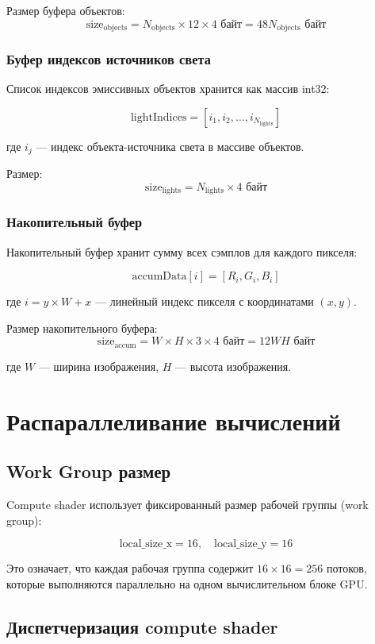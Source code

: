 \documentclass[14pt, a4paper]{extarticle}
\begin{document}
Размер буфера объектов:
\[
\text{size}_{\text{objects}} = N_{\text{objects}} \times 12 \times 4 \text{ байт} = 48N_{\text{objects}} \text{ байт}
\]

\subsubsection{Буфер индексов источников света}

Список индексов эмиссивных объектов хранится как массив int32:

\[
\text{lightIndices} = [i_1, i_2, \ldots, i_{N_{\text{lights}}}]
\]

где $i_j$ --- индекс объекта-источника света в массиве объектов.

Размер:
\[
\text{size}_{\text{lights}} = N_{\text{lights}} \times 4 \text{ байт}
\]

\subsubsection{Накопительный буфер}

Накопительный буфер хранит сумму всех сэмплов для каждого пикселя:

\[
\text{accumData}[i] = [R_i, G_i, B_i]
\]

где $i = y \times W + x$ --- линейный индекс пикселя с координатами $(x, y)$.

Размер накопительного буфера:
\[
\text{size}_{\text{accum}} = W \times H \times 3 \times 4 \text{ байт} = 12WH \text{ байт}
\]

где $W$ --- ширина изображения, $H$ --- высота изображения.

\section{Распараллеливание вычислений}

\subsection{Work Group размер}

Compute shader использует фиксированный размер рабочей группы (work group):

\[
\text{local\_size\_x} = 16, \quad \text{local\_size\_y} = 16
\]

Это означает, что каждая рабочая группа содержит $16 \times 16 = 256$ потоков, которые выполняются параллельно на одном вычислительном блоке GPU.

\subsection{Диспетчеризация compute shader}
\end{document}
